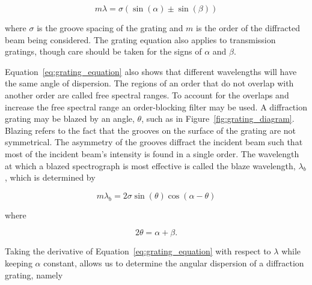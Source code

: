 \begin{equation}
    m\lambda = \sigma (\sin(\alpha) \pm \sin(\beta))
    \label{eq:grating_equation}
\end{equation}

\noindent where $\sigma$ is the groove spacing of the grating and $m$ is the order of the diffracted beam being considered. The grating equation also applies to transmission gratings, though care should be taken for the signs of $\alpha$ and $\beta$.
\prgph


Equation~\ref{eq:grating_equation} also shows that different wavelengths will have the same angle of dispersion. The regions of an order that do not overlap with another order are called free spectral ranges. To account for the overlaps and increase the free spectral range an order-blocking filter may be used. A diffraction grating may be blazed by an angle, $\theta$, such as in Figure~\ref{fig:grating_diagram}. Blazing refers to the fact that the grooves on the surface of the grating are not symmetrical. The asymmetry of the grooves diffract the incident beam such that most of the incident beam's intensity is found in a single order. The wavelength at which a blazed spectrograph is most effective is called the blaze wavelength, $\lambda_{b}$, which is determined by

\begin{equation}
    m\lambda_{b} = 2\sigma\sin(\theta)\cos(\alpha - \theta)
    \label{eq:blaze_wavelength}
\end{equation}

\noindent where

\begin{equation}
    2\theta = \alpha + \beta.
\end{equation}

Taking the derivative of Equation~\ref{eq:grating_equation} with respect to $\lambda$ while keeping $\alpha$ constant, allows us to determine the angular dispersion of a diffraction grating, namely

